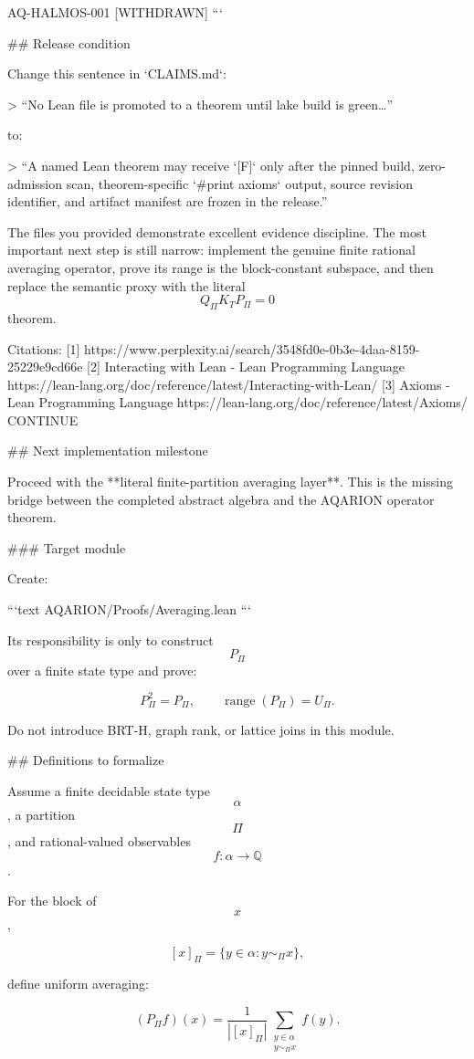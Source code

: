 AQ-HALMOS-001
[WITHDRAWN]
```

## Release condition

Change this sentence in `CLAIMS.md`:

> “No Lean file is promoted to a theorem until lake build is green…”

to:

> “A named Lean theorem may receive `[F]` only after the pinned build, zero-admission scan, theorem-specific `#print axioms` output, source revision identifier, and artifact manifest are frozen in the release.”

The files you provided demonstrate excellent evidence discipline. The most important next step is still narrow: implement the genuine finite rational averaging operator, prove its range is the block-constant subspace, and then replace the semantic proxy with the literal $$Q_\Pi K_TP_\Pi=0$$ theorem.

Citations:
[1] https://www.perplexity.ai/search/3548fd0e-0b3e-4daa-8159-25229e9cd66e
[2] Interacting with Lean - Lean Programming Language https://lean-lang.org/doc/reference/latest/Interacting-with-Lean/
[3] Axioms - Lean Programming Language https://lean-lang.org/doc/reference/latest/Axioms/
CONTINUE

## Next implementation milestone

Proceed with the **literal finite-partition averaging layer**. This is the missing bridge between the completed abstract algebra and the AQARION operator theorem.

### Target module

Create:

```text
AQARION/Proofs/Averaging.lean
```

Its responsibility is only to construct $$P_\Pi$$ over a finite state type and prove:

$$
P_\Pi^2=P_\Pi,
\qquad
\operatorname{range}(P_\Pi)=U_\Pi.
$$

Do not introduce BRT-H, graph rank, or lattice joins in this module.

## Definitions to formalize

Assume a finite decidable state type $$\alpha$$, a partition $$\Pi$$, and rational-valued observables $$f:\alpha\to\mathbb Q$$.

For the block of $$x$$,

$$
[x]_\Pi=\{y\in\alpha:y\sim_\Pi x\},
$$

define uniform averaging:

$$
(P_\Pi f)(x)
=
\frac{1}{|[x]_\Pi|}
\sum_{\substack{y\in\alpha\\y\sim_\Pi x}}f(y).
$$

